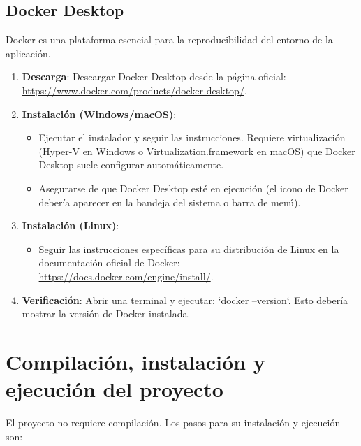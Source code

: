 \subsection{Docker Desktop}
Docker es una plataforma esencial para la reproducibilidad del entorno de la aplicación.
\begin{enumerate}
\item \textbf{Descarga}: Descargar Docker Desktop desde la página oficial: \url{https://www.docker.com/products/docker-desktop/}.
\item \textbf{Instalación (Windows/macOS)}:
\begin{itemize}
\item Ejecutar el instalador y seguir las instrucciones. Requiere virtualización (Hyper-V en Windows o Virtualization.framework en macOS) que Docker Desktop suele configurar automáticamente.
\item Asegurarse de que Docker Desktop esté en ejecución (el icono de Docker debería aparecer en la bandeja del sistema o barra de menú).
\end{itemize}
\item \textbf{Instalación (Linux)}:
\begin{itemize}
\item Seguir las instrucciones específicas para su distribución de Linux en la documentación oficial de Docker: \url{https://docs.docker.com/engine/install/}.
\end{itemize}
\item \textbf{Verificación}: Abrir una terminal y ejecutar: `docker --version`. Esto debería mostrar la versión de Docker instalada.
\end{enumerate}

\section{Compilación, instalación y ejecución del proyecto}
El proyecto no requiere compilación. Los pasos para su instalación y ejecución son:

